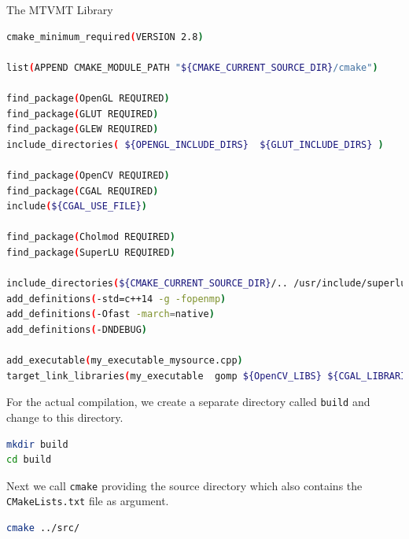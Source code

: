\begin{chapter}{The MTVMT Library}
\begin{lstlisting}[language=bash,label=code:cmake_example,caption={Example CMakeLists.txt}]
cmake_minimum_required(VERSION 2.8)

list(APPEND CMAKE_MODULE_PATH "${CMAKE_CURRENT_SOURCE_DIR}/cmake")

find_package(OpenGL REQUIRED)
find_package(GLUT REQUIRED)
find_package(GLEW REQUIRED)
include_directories( ${OPENGL_INCLUDE_DIRS}  ${GLUT_INCLUDE_DIRS} )

find_package(OpenCV REQUIRED)
find_package(CGAL REQUIRED)
include(${CGAL_USE_FILE})

find_package(Cholmod REQUIRED)
find_package(SuperLU REQUIRED)

include_directories(${CMAKE_CURRENT_SOURCE_DIR}/.. /usr/include/superlu /usr/include/eigen3 $ENV{HOME}/projects/iod)
add_definitions(-std=c++14 -g -fopenmp)
add_definitions(-Ofast -march=native)
add_definitions(-DNDEBUG)

add_executable(my_executable_mysource.cpp)
target_link_libraries(my_executable  gomp ${OpenCV_LIBS} ${CGAL_LIBRARIES} ${CHOLMOD_LIBRARIES} ${SUPERLU_LIBRARIES} ${OPENGL_LIBRARIES} ${GLUT_LIBRARY} ${GLEW_LIBRARIES})
\end{lstlisting}

For the actual compilation, we create a separate directory called \texttt{build} and change to this directory.
\begin{lstlisting}[language=bash]
mkdir build
cd build
\end{lstlisting}

Next we call \texttt{cmake} providing the source directory which also contains the \texttt{CMakeLists.txt} file as argument.
\begin{lstlisting}[language=bash]
cmake ../src/
\end{lstlisting}


\end{chapter}
